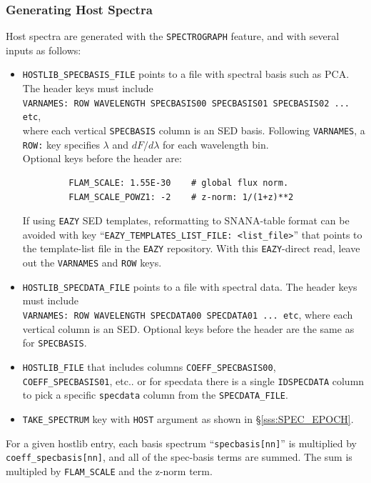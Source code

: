 \documentclass[12pt]{article}
\newcommand{\Flam}{dF/d\lambda}
\begin{document}
{%

\newcommand{\Sn}{{\cal S}_{n}}


\clearpage
\subsubsection{Generating Host Spectra}
\label{sss:hostlib_spectra}

Host spectra are generated with the {\tt SPECTROGRAPH} feature,
and with several inputs as follows:
\begin{itemize}[noitemsep]
  \item {\tt HOSTLIB\_SPECBASIS\_FILE} points to a file with spectral basis
         such as PCA. The header keys must include \\
         {\tt VARNAMES: ROW  WAVELENGTH  SPECBASIS00 SPECBASIS01 SPECBASIS02 ... etc}, \\
         where each vertical {\tt SPECBASIS} column is an SED basis. Following {\tt VARNAMES},
         a {\tt ROW:} key specifies $\lambda$ and $\Flam$ for each wavelength bin. \\
         Optional keys before the header are:
          \vspace{-0.5cm}
     \begin{verbatim}
         FLAM_SCALE: 1.55E-30    # global flux norm.
         FLAM_SCALE_POWZ1: -2    # z-norm: 1/(1+z)**2
     \end{verbatim}  \vspace{-1.0cm}
    If using {\tt EAZY} SED templates, reformatting to SNANA-table format can be avoided with
    key ``{\tt EAZY\_TEMPLATES\_LIST\_FILE: <list\_file>}'' that points to the template-list file
    in the {\tt EAZY} repository. With this {\tt EAZY}-direct read, 
    leave out the {\tt VARNAMES} and {\tt ROW} keys.
%
  \item {\tt HOSTLIB\_SPECDATA\_FILE} points to a file with spectral data.
         The header keys must include \\
         {\tt VARNAMES: ROW  WAVELENGTH  SPECDATA00 SPECDATA01 ... etc}, 
         where each vertical column is an SED.
         Optional keys before the header are the same as for {\tt SPECBASIS}.
%
  \item {\tt HOSTLIB\_FILE} that includes columns 
          {\tt COEFF\_SPECBASIS00}, {\tt COEFF\_SPECBASIS01}, etc..
          or for specdata there is a single {\tt IDSPECDATA} column
          to pick a specific {\tt specdata} column from the
          {\tt SPECDATA\_FILE}.
  \item {\tt TAKE\_SPECTRUM} key with {\tt HOST} argument as shown in 
           \S\ref{sss:SPEC_EPOCH}.
\end{itemize}
%
For a given hostlib entry, each basis spectrum ``{\tt specbasis[nn]}''
is multiplied by {\tt coeff\_specbasis[nn]}, and all of the spec-basis
terms are summed. The sum is multipled by {\tt FLAM\_SCALE} and
the z-norm term. 


}
\end{document}
